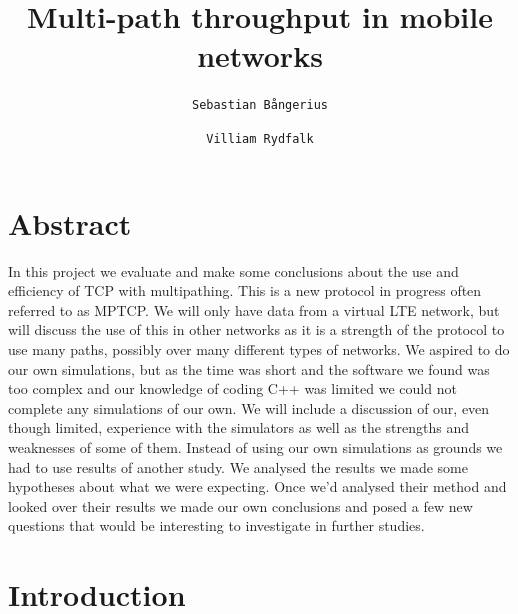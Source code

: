 \documentclass[11pt,twocolumn]{article}
\author{
  \texttt{Sebastian Bångerius}
  \and
  \texttt{Villiam Rydfalk}
}
\begin{document}

\title{Multi-path throughput in mobile networks}
\maketitle

\cleardoublepage


\section{Abstract}

In this project we evaluate and make some conclusions about the use and efficiency of TCP with multipathing. This is a new protocol in progress often referred to as MPTCP. We will only have data from a virtual LTE network, but will discuss the use of this in other networks as it is a strength of the protocol to use many paths, possibly over many different types of networks. We aspired to do our own simulations, but as the time was short and the software we found  was too complex and our knowledge of coding C++ was limited we could not complete any simulations of our own. We will include a discussion of our, even though limited, experience with the simulators as well as the strengths and weaknesses of some of them. Instead of using our own simulations as grounds we had to use results of another study. \cite{MPTCP-LTE} We analysed the results we made some hypotheses about what we were expecting. Once we'd analysed their method and looked over their results we made our own conclusions and posed a few new questions that would be interesting to investigate in further studies.



\section{Introduction}
\end{document}
